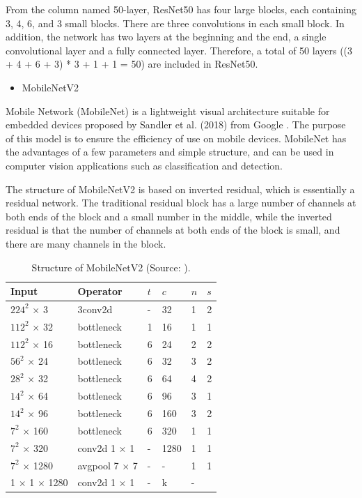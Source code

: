 \documentclass[sensors,article,submit,moreauthors,pdftex]{Definitions/mdpi}
\begin{document}
From the column named 50-layer, ResNet50 has four large blocks, each containing 3, 4, 6, and 3 small blocks. There are three convolutions in each small block. In addition, the network has two layers at the beginning and the end, a single convolutional layer and a fully connected layer. Therefore, a total of 50 layers ((3 + 4 + 6 + 3) * 3 + 1 + 1 = 50) are included in ResNet50.


\begin{itemize}
\item MobileNetV2
\end{itemize}

Mobile Network (MobileNet) is a lightweight visual architecture suitable for embedded devices proposed by Sandler et al. (2018) from Google \cite{sandler2018mobilenetv2}. The purpose of this model is to ensure the efficiency of use on mobile devices. MobileNet has the advantages of a few parameters and simple structure, and can be used in computer vision applications such as classification and detection.

The structure of MobileNetV2 is based on inverted residual, which is essentially a residual network. The traditional residual block has a large number of channels at both ends of the block and a small number in the middle, while the inverted residual is that the number of channels at both ends of the block is small, and there are many channels in the block.


\begin{table}[htbp]
\centering
\caption{Structure of MobileNetV2 (Source: \cite{sandler2018mobilenetv2}).}
\begin{tabular}{llllll} 
\toprule
\textbf{Input}&\textbf{Operator}&\textbf{$t$}&\textbf{$c$}&\textbf{$n$}&\textbf{$s$}\\
\midrule
$224^2$ $\times$ 3&3conv2d & - & 32 & 1 & 2\\
$112^2$ $\times$ 32& bottleneck & 1 & 16 & 1 &1\\
$112^2$ $\times$ 16& bottleneck & 6 & 24 & 2 &2\\
$56^2$ $\times$ 24& bottleneck & 6 & 32 & 3 &2\\
$28^2$ $\times$ 32& bottleneck & 6 & 64 & 4 &2\\
$14^2$ $\times$ 64& bottleneck & 6 & 96 & 3 &1\\
$14^2$ $\times$ 96& bottleneck & 6 & 160 & 3 &2\\
$7^2$ $\times$ 160& bottleneck & 6 & 320 & 1 &1\\
$7^2$ $\times$ 320& conv2d 1 $\times$ 1 & - & 1280 & 1 &1\\
$7^2$ $\times$ 1280& avgpool 7 $\times$ 7& - & - & 1& 1\\
1 $\times$ 1 $\times$ 1280& conv2d 1 $\times$ 1& - & k & - & \\
\bottomrule
\end{tabular}
\label{tbl:MobileNetV2}
\end{table}
\end{document}

